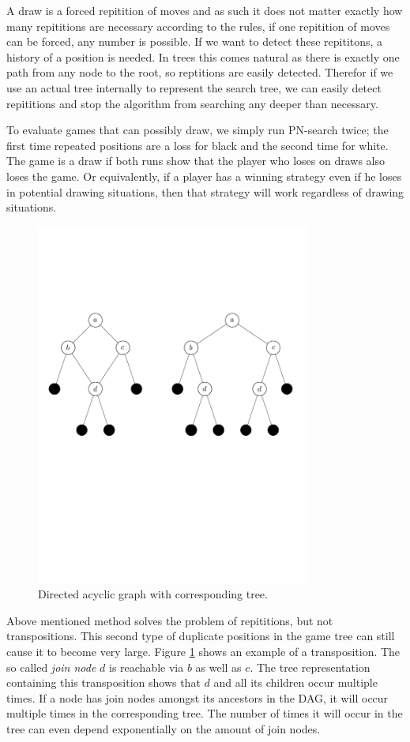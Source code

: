 \documentclass{article}
\begin{document}
A draw is a forced repitition of moves and as such it does not matter exactly how many repititions are necessary according to the rules,
if one repitition of moves can be forced, any number is possible. If we want to detect these repititons, a history of a position is needed. In trees this
comes natural as there is exactly one path from any node to the root, so reptitions are easily detected. Therefor if we use an actual tree internally
to represent the search tree, we can easily detect repititions and stop the algorithm from searching any deeper than necessary.

To evaluate games that can possibly draw, we simply run PN-search twice; the first time repeated positions are a loss for black and the second time for white.
The game is a draw if both runs show that the player who loses on draws also loses the game. Or equivalently, if a player has a winning strategy
even if he loses in potential drawing situations, then that strategy will work regardless of drawing situations.\\

\begin{figure}[h]
\center
\includegraphics[trim = 0mm 10cm 0cm 0cm, clip, width=9cm]{treevsgraph.pdf}
\caption{Directed acyclic graph with corresponding tree.}
\label{treevsgraph}
\end{figure}

Above mentioned method solves the problem of repititions, but not transpositions. This second type of duplicate positions in the game tree
can still cause it to become very large. Figure \ref{treevsgraph} shows an example of a transposition. The so called \emph{join node} $d$ is
reachable via $b$ as well as $c$. The tree representation containing this transposition shows that $d$ and all its children occur multiple times.
If a node has join nodes amongst its ancestors in the DAG, it will
occur multiple times in the corresponding tree. The number of times it will occur in the tree can even depend exponentially on the amount of join
nodes.
\end{document}
